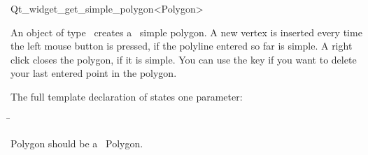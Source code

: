 
\begin{ccRefClass}{Qt_widget_get_simple_polygon<Polygon>}

\ccDefinition
An object of type \ccRefName\ creates a \cgal\ simple polygon.
A new vertex is inserted every time the left mouse button is pressed, if the 
polyline entered so far is simple. A right click closes the polygon, if
it is simple. You can use the  key if you want to delete
your last entered point in the polygon.


\ccParameters

The full template declaration of  states one parameter:

\begin{tabbing}
 \=\\
\end{tabbing}

Polygon should be a \cgal\ Polygon.

\ccInheritsFrom
{}
\ccGlue

\ccCreation
{}


\end{ccRefClass}








